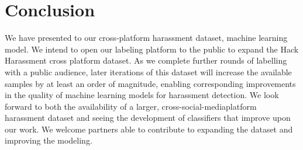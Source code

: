 \documentclass[11pt,a4paper]{article}
\begin{document}
\section{Conclusion}
We have presented to our cross-platform harassment
dataset, machine learning model. We intend
to open our labeling platform to the public to expand
the Hack Harassment cross platform dataset.
As we complete further rounds of labelling with a
public audience, later iterations of this dataset will
increase the available samples by at least an order
of magnitude, enabling corresponding improvements
in the quality of machine learning models
for harassment detection. We look forward to both
the availability of a larger, cross-social-mediaplatform
harassment dataset and seeing the development
of classifiers that improve upon our work.
We welcome partners able to contribute to expanding
the dataset and improving the modeling.




%
%


\end{document}
